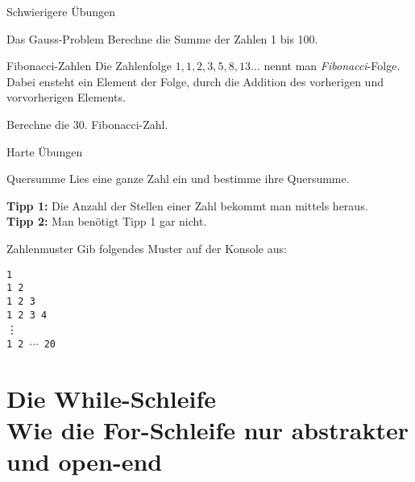 \begin{frame}{Schwierigere Übungen}

\begin{block}{Das Gauss-Problem}
\vspace{2pt}	
Berechne die Summe der Zahlen 1 bis 100. 
\end{block}
\vspace{12pt}
\pause

\begin{block}{Fibonacci-Zahlen}
	\vspace{2pt}
Die Zahlenfolge $1,1,2,3,5,8,13\ldots$ nennt man \emph{Fibonacci}-Folge. Dabei ensteht ein Element der Folge, durch die Addition des vorherigen und vorvorherigen Elements. 

\vspace{1pt}

Berechne die 30. Fibonacci-Zahl.  
\end{block}

\end{frame}

\begin{frame}{Harte Übungen}

\begin{block}{Quersumme}
	\vspace{2pt}
	Lies eine ganze Zahl  ein und bestimme ihre Quersumme. 
	
	\textbf{Tipp 1:} Die Anzahl der Stellen einer Zahl bekommt man mittels  heraus. \\
	\textbf{Tipp 2:} Man benötigt Tipp 1 gar nicht.  
	
\end{block}

\vspace{12pt}
\pause

\begin{block}{Zahlenmuster}
	\vspace{2pt}	
	Gib folgendes Muster auf der Konsole aus: 
	
	\texttt{1} \\
	\texttt{1 2} \\
	\texttt{1 2 3} \\
	\texttt{1 2 3 4} \\
	\phantom{1 2 } \vdots \\
	\texttt{1 2 $\cdots$ 20}
\end{block}


\end{frame}


\section{Die While-Schleife \\ \footnotesize Wie die For-Schleife nur abstrakter und open-end}

